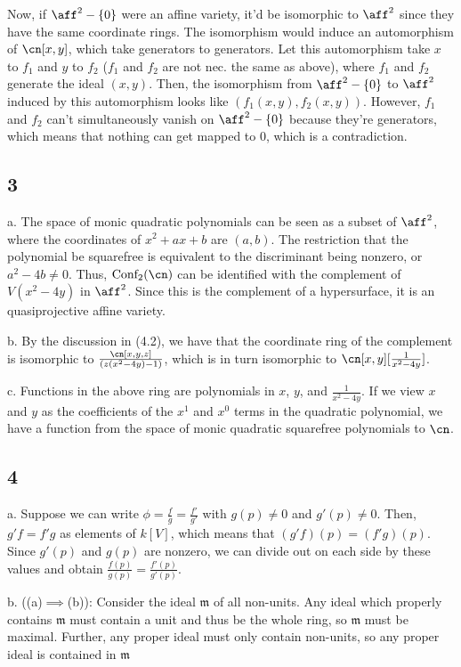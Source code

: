\documentclass{article}
\begin{document}
Now, if $\aff^2-\{0\}$ were an affine variety, it'd be isomorphic to $\aff^2$ since they have the same coordinate rings. The isomorphism would induce an automorphism of $\cn[x,y]$, which take generators to generators. Let this automorphism take $x$ to $f_1$ and $y$ to $f_2$ ($f_1$ and $f_2$ are not nec. the same as above), where $f_1$ and $f_2$ generate the ideal $(x,y)$. Then, the isomorphism from $\aff^2-\{0\}$ to $\aff^2$ induced by this automorphism looks like $(f_1(x,y),f_2(x,y))$. However, $f_1$ and $f_2$ can't simultaneously vanish on $\aff^2-\{0\}$ because they're generators, which means that nothing can get mapped to $0$, which is a contradiction.
\subsection*{3}
a. The space of monic quadratic polynomials can be seen as a subset of $\aff^2$, where the coordinates of $x^2+ax+b$ are $(a,b)$. The restriction that the polynomial be squarefree is equivalent to the discriminant being nonzero, or $a^2-4b\neq0$. Thus, $\text{Conf}_2(\cn)$ can be identified with the complement of $V(x^2-4y)$ in $\aff^2$. Since this is the complement of a hypersurface, it is an quasiprojective affine variety.

\noindent b. By the discussion in (4.2), we have that the coordinate ring of the complement is isomorphic to $\frac{\cn[x,y,z]}{(z(x^2-4y)-1)}$, which is in turn isomorphic to $\cn[x,y][\frac{1}{x^2-4y}]$. 

\noindent c. Functions in the above ring are polynomials in $x$, $y$, and $\frac{1}{x^2-4y}$. If we view $x$ and $y$ as the coefficients of the $x^1$ and $x^0$ terms in the quadratic polynomial, we have a function from the space of monic quadratic squarefree polynomials to $\cn$.
\subsection*{4}
a. Suppose we can write $\phi=\frac{f}{g}=\frac{f'}{g'}$ with $g(p)\neq0$ and $g'(p)\neq0$. Then, $g'f=f'g$ as elements of $k[V]$, which means that $(g'f)(p)=(f'g)(p)$. Since $g'(p)$ and $g(p)$ are nonzero, we can divide out on each side by these values and obtain $\frac{f(p)}{g(p)}=\frac{f'(p)}{g'(p)}$.

\noindent b. ((a)$\implies$(b)): Consider the ideal $\mathfrak{m}$ of all non-units. Any ideal which properly contains $\mathfrak{m}$ must contain a unit and thus be the whole ring, so $\mathfrak{m}$ must be maximal. Further, any proper ideal must only contain non-units, so any proper ideal is contained in $\mathfrak{m}$
\end{document}
